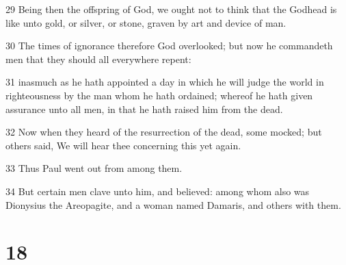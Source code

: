 \par 29 Being then the offspring of God, we ought not to think that the Godhead is like unto gold, or silver, or stone, graven by art and device of man.
\par 30 The times of ignorance therefore God overlooked; but now he commandeth men that they should all everywhere repent:
\par 31 inasmuch as he hath appointed a day in which he will judge the world in righteousness by the man whom he hath ordained; whereof he hath given assurance unto all men, in that he hath raised him from the dead.
\par 32 Now when they heard of the resurrection of the dead, some mocked; but others said, We will hear thee concerning this yet again.
\par 33 Thus Paul went out from among them.
\par 34 But certain men clave unto him, and believed: among whom also was Dionysius the Areopagite, and a woman named Damaris, and others with them.

\chapter{18}

